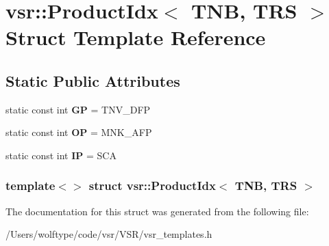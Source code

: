 \hypertarget{structvsr_1_1_product_idx_3_01_t_n_b_00_01_t_r_s_01_4}{\section{vsr\-:\-:Product\-Idx$<$ T\-N\-B, T\-R\-S $>$ Struct Template Reference}
\label{structvsr_1_1_product_idx_3_01_t_n_b_00_01_t_r_s_01_4}
}
\subsection*{Static Public Attributes}
\begin{DoxyCompactItemize}
\item 
\hypertarget{structvsr_1_1_product_idx_3_01_t_n_b_00_01_t_r_s_01_4_aa195370800c1ad3637975b094aa877c9}{static const int {\bfseries G\-P} = T\-N\-V\-\_\-\-D\-F\-P}\label{structvsr_1_1_product_idx_3_01_t_n_b_00_01_t_r_s_01_4_aa195370800c1ad3637975b094aa877c9}

\item 
\hypertarget{structvsr_1_1_product_idx_3_01_t_n_b_00_01_t_r_s_01_4_a0cb95f5c09651b91f9e4734d272ec981}{static const int {\bfseries O\-P} = M\-N\-K\-\_\-\-A\-F\-P}\label{structvsr_1_1_product_idx_3_01_t_n_b_00_01_t_r_s_01_4_a0cb95f5c09651b91f9e4734d272ec981}

\item 
\hypertarget{structvsr_1_1_product_idx_3_01_t_n_b_00_01_t_r_s_01_4_a294dcdedabbfa7c8297715fcbe0cb916}{static const int {\bfseries I\-P} = S\-C\-A}\label{structvsr_1_1_product_idx_3_01_t_n_b_00_01_t_r_s_01_4_a294dcdedabbfa7c8297715fcbe0cb916}

\end{DoxyCompactItemize}
\subsubsection*{template$<$$>$ struct vsr\-::\-Product\-Idx$<$ T\-N\-B, T\-R\-S $>$}



The documentation for this struct was generated from the following file\-:\begin{DoxyCompactItemize}
\item 
/\-Users/wolftype/code/vsr/\-V\-S\-R/vsr\-\_\-templates.\-h\end{DoxyCompactItemize}
